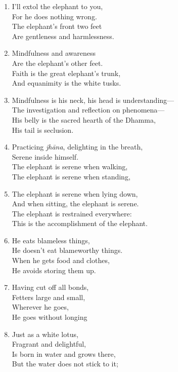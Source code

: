 \documentclass[10pt, openany]{book}
\begin{document}
\begin{enumerate}
\item I’ll extol the elephant to you,\\
For he does nothing wrong.\\
The elephant’s front two feet \\
Are gentleness and harmlessness.

\item Mindfulness and awareness\\
Are the elephant’s other feet.\\
Faith is the great elephant’s trunk,\\
And equanimity is the white tusks.

\item Mindfulness is his neck, his head is understanding—\\
The investigation and reflection on phenomena—\\
His belly is the sacred hearth of the Dhamma,\\
His tail is seclusion.

\item Practicing \emph{jhāna}, delighting in the breath,\\
Serene inside himself.\\
The elephant is serene when walking,\\
The elephant is serene when standing,

\item The elephant is serene when lying down,\\
And when sitting, the elephant is serene.\\
The elephant is restrained everywhere:\\
This is the accomplishment of the elephant.

\item He eats blameless things,\\
He doesn’t eat blameworthy things.\\
When he gets food and clothes,\\
He avoids storing them up.

\item Having cut off all bonds,\\
Fetters large and small,\\
Wherever he goes,\\
He goes without longing

\item Just as a white lotus,\\
Fragrant and delightful,\\
Is born in water and grows there,\\
But the water does not stick to it;


\end{enumerate}
\end{document}
